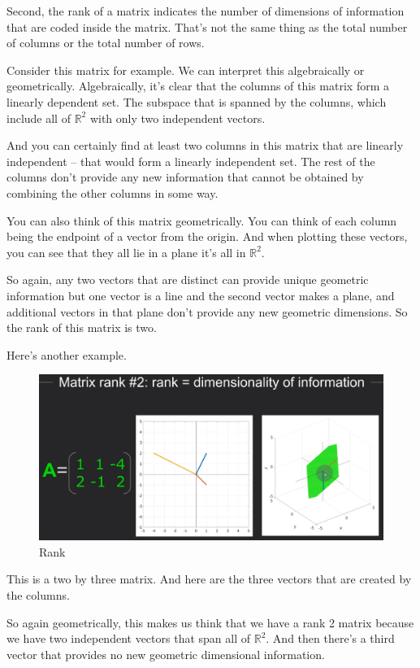 \documentclass[fleqn,10pt]{olplainarticle}
\theoremstyle{definition}
\theoremstyle{remark}
\begin{document}
Second, the rank of a matrix indicates the number of dimensions of information that are coded inside the matrix. That's not the same thing as the total number of columns or the total number of rows.

Consider this matrix for example. We can interpret this algebraically or geometrically. Algebraically, it's clear that the columns of this matrix form a linearly dependent set. The subspace that is spanned by the columns, which include all of $\mathbb{R}^2$ with only two independent vectors.

And you can certainly find at least two columns in this matrix that are linearly independent -- that would form a linearly independent set. The rest of the columns don't provide any new information that cannot be obtained by combining the other columns in some way.

You can also think of this matrix geometrically. You can think of each column being the endpoint of a vector from the origin. And when plotting these vectors, you can see that they all lie in a plane it's all in $\mathbb{R}^2$.

So again, any two vectors that are distinct can provide unique geometric information but one vector is a line and the second vector makes a plane, and additional vectors in that plane don't provide any new geometric dimensions. So the rank of this matrix is two.

Here's another example.

\begin{figure}[ht]
	\centering
	\includegraphics[width=0.7\linewidth]{images/rank-03.png}
	\caption{Rank}
	\label{fig:rank_03}
\end{figure}

This is a two by three matrix. And here are the three vectors that are created by the columns.

So again geometrically, this makes us think that we have a rank 2 matrix because we have two independent vectors that span all of $\mathbb{R}^2$. And then there's a third vector that provides no new geometric dimensional information.
\end{document}
